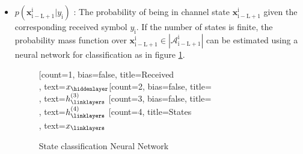 \documentclass[12pt,a4paper]{article}
\begin{document}
\begin{itemize}
\item $p(\mathbf{x}_{\mathrm{i-L+1}}^{\mathrm{i}}|y_{\mathrm{i}})$
: The probability of being in channel state $\mathbf{x}_{\mathrm{i-L+1}}^{\mathrm{i}}$ given the corresponding received symbol $y_{\mathrm{i}}$. If the number of states is finite, the probability mass function over $\mathbf{x}_{\mathrm{i-L+1}}^{\mathrm{i}} \in
|\mathcal{A}_{\mathrm{i-L+1}}^{\mathrm{i}}|$ can be estimated using a neural network for classification as in figure \ref{nn}. 
	\begin{figure}[H]
	\centering
		\begin{neuralnetwork}[height=4, nodespacing=10mm, layerspacing=15mm]
		\newcommand{\x}[2]{$x_#2$}
		\newcommand{\y}[2]{$\hat{y}_#2$}
		\newcommand{\hfirst}[2]{\small $h^{(1)}_#2$}
		\newcommand{\hsecond}[2]{\small $h^{(2)}_#2$}
		\newcommand{\hthird}[2]{\small $h^{(3)}_#2$}
		\newcommand{\hfourth}[2]{\small $h^{(4)}_#2$}
		[count=1, bias=false, title=Received\\, text=\x]
		\hiddenlayer[count=2, bias=false, title=\\, text=\hthird] \linklayers
		\hiddenlayer[count=3, bias=false, title=\\, text=\hfourth] \linklayers
		\outputlayer[count=4, title=States\\, text=\x] \linklayers
	    \end{neuralnetwork}
	    	  	  \caption{State classification Neural Network}
\label{nn}
	\end{figure}


\end{itemize}
\end{document}
